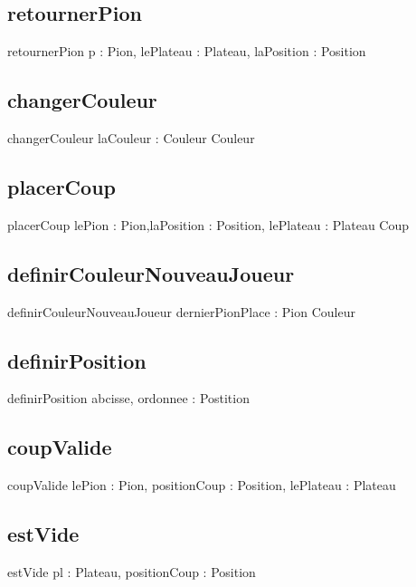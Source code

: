 	\subsection{retournerPion}
		\begin{algorithme}
			\signatureprocedure
				{retournerPion}
				{p : Pion, lePlateau : Plateau, laPosition : Position}
		\end{algorithme}
	\subsection{changerCouleur}
		\begin{algorithme}
			\signaturefonction
				{changerCouleur}
				{laCouleur : Couleur}
				{Couleur}
		\end{algorithme}

	\subsection{placerCoup}
		\begin{algorithme}
			\signaturefonction
				{placerCoup}
				{lePion : Pion,laPosition : Position, lePlateau : Plateau}
				{Coup}
		\end{algorithme}
	\subsection{definirCouleurNouveauJoueur}
		\begin{algorithme}
			\signaturefonction
				{definirCouleurNouveauJoueur}
				{dernierPionPlace : Pion}
				{Couleur}
		\end{algorithme}
	\subsection{definirPosition}
		\begin{algorithme}
			\signaturefonction
				{definirPosition}
				{abcisse, ordonnee : \caractere}
				{Postition}
		\end{algorithme}
	\subsection{coupValide}
		\begin{algorithme}
			\signaturefonction
				{coupValide}
				{lePion : Pion, positionCoup : Position, lePlateau : Plateau}
				{\booleen}
		\end{algorithme}
	\subsection{estVide}
		\begin{algorithme}
			\signaturefonction
				{estVide}
				{pl : Plateau, positionCoup : Position}
				{\booleen}
		\end{algorithme}
